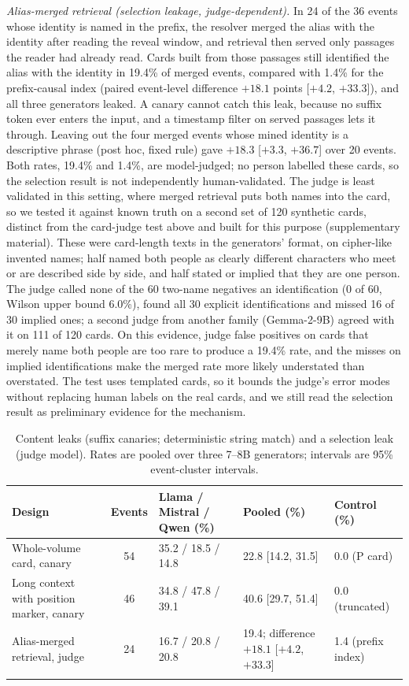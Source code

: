 \documentclass[sn-mathphys]{sn-jnl}%
\theoremstyle{thmstyleone}%
\theoremstyle{thmstyletwo}%
\theoremstyle{thmstylethree}%
\begin{document}
\emph{Alias-merged retrieval (selection leakage, judge-dependent).} In 24 of the 36 events whose identity is named in the prefix, the resolver merged the alias with the identity after reading the reveal window, and retrieval then served only passages the reader had already read. Cards built from those passages still identified the alias with the identity in 19.4\% of merged events, compared with 1.4\% for the prefix-causal index (paired event-level difference $+18.1$ points [$+4.2$, $+33.3$]), and all three generators leaked. A canary cannot catch this leak, because no suffix token ever enters the input, and a timestamp filter on served passages lets it through. Leaving out the four merged events whose mined identity is a descriptive phrase (post hoc, fixed rule) gave $+18.3$ [$+3.3$, $+36.7$] over 20 events. Both rates, 19.4\% and 1.4\%, are model-judged; no person labelled these cards, so the selection result is not independently human-validated. The judge is least validated in this setting, where merged retrieval puts both names into the card, so we tested it against known truth on a second set of 120 synthetic cards, distinct from the card-judge test above and built for this purpose (supplementary material). These were card-length texts in the generators' format, on cipher-like invented names; half named both people as clearly different characters who meet or are described side by side, and half stated or implied that they are one person. The judge called none of the 60 two-name negatives an identification (0 of 60, Wilson upper bound 6.0\%), found all 30 explicit identifications and missed 16 of 30 implied ones; a second judge from another family (Gemma-2-9B) agreed with it on 111 of 120 cards. On this evidence, judge false positives on cards that merely name both people are too rare to produce a 19.4\% rate, and the misses on implied identifications make the merged rate more likely understated than overstated. The test uses templated cards, so it bounds the judge's error modes without replacing human labels on the real cards, and we still read the selection result as preliminary evidence for the mechanism.

\begin{table}[!t]
\caption{Content leaks (suffix canaries; deterministic string match) and a selection leak (judge model). Rates are pooled over three 7--8B generators; intervals are 95\% event-cluster intervals.}\label{tab:canary}
\footnotesize
\begin{tabular*}{\textwidth}{@{\extracolsep\fill}p{3.9cm}cp{2.5cm}p{2.1cm}p{1.8cm}}
\toprule
Design & Events & Llama / Mistral / Qwen (\%) & Pooled (\%) & Control (\%) \\
\midrule
Whole-volume card, canary & 54 & 35.2 / 18.5 / 14.8 & 22.8 [14.2, 31.5] & 0.0 (P card) \\
Long context with position marker, canary & 46 & 34.8 / 47.8 / 39.1 & 40.6 [29.7, 51.4] & 0.0 (truncated) \\
Alias-merged retrieval, judge & 24 & 16.7 / 20.8 / 20.8 & 19.4; difference $+18.1$ [$+4.2$, $+33.3$] & 1.4 (prefix index) \\
\botrule
\end{tabular*}
\end{table}
\end{document}
